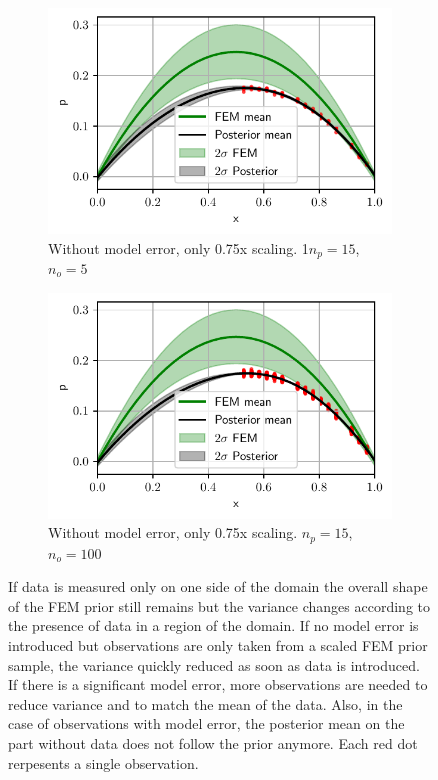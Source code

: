 \documentclass[%
  a4paper,oneside,%
  11pt,%
  smallchapters,
  style=printdev,
  extramargin,
  green,%
  rgb, <cmyk>
  ]{tubsbook}
\begin{document}
\begin{figure}[!ht]
	\begin{subfigure}[t]{.5\textwidth}
	\centering
	\includegraphics[width=1\linewidth]{../../Python/Results/1D/HalfSide/No_Model_Error/5o_15s/Result.pdf}
	\caption{Without model error, only 0.75x scaling. 1$n_p=15$, $n_o=5$}
		\label{fig:1DOneSidedc}
	\end{subfigure}%
	\begin{subfigure}[t]{.5\textwidth}
	\centering
	\includegraphics[width=1\linewidth]{../../Python/Results/1D/HalfSide/No_Model_Error/100o_15s/Result.pdf}
\centering
\caption{Without model error, only 0.75x scaling. $n_p=15$, $n_o=100$}
\label{fig:1DOneSidedd}
	\end{subfigure}

\caption[Posterior of the 1D example for observations only on one side of the domain]{If data is measured only on one side of the domain the overall shape of the FEM prior still remains but the variance changes according to the presence of data in a region of the domain. If no model error is introduced but observations are only taken from a scaled FEM prior sample, the variance quickly reduced as soon as data is introduced. If there is a significant model error, more observations are needed to reduce variance and to match the mean of the data. Also, in the case of observations with model error, the posterior mean on the part without data does not follow the prior anymore. Each red dot rerpesents a single observation.}
\label{fig:1DOneSided}
\end{figure}
%
\FloatBarrier
\end{document}
